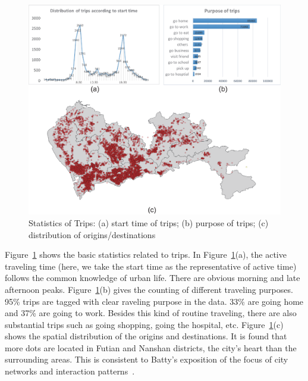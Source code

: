 \begin{figure}[htb!]
 \centering %
 \includegraphics[width=\columnwidth]{pictures/data3}
 \caption{Statistics of Trips: (a) start time of trips; (b) purpose of trips; (c) distribution of origins/destinations }
 \label{fig:data_geometry}
\end{figure}

Figure~\ref{fig:data_geometry} shows the basic statistics related to trips. In Figure~\ref{fig:data_geometry}(a), the active traveling time (here, we take the start time as the representative of active time) follows the common knowledge of urban life. There are obvious morning and late afternoon peaks. Figure~\ref{fig:data_geometry}(b) gives the counting of different traveling purposes. 95\% trips are tagged with clear raveling purpose in the data. 33\% are going home and 37\% are going to work. Besides this kind of routine traveling, there are also substantial trips such as going shopping, going the hospital, etc. Figure~\ref{fig:data_geometry}(c) shows the spatial distribution of the origins and destinations. It is found that more dots are located in Futian and Nanshan districts, the city's heart than the surrounding areas. This is consistent to Batty's exposition of the focus of city networks and interaction patterns~\citep{batty2013new}.



